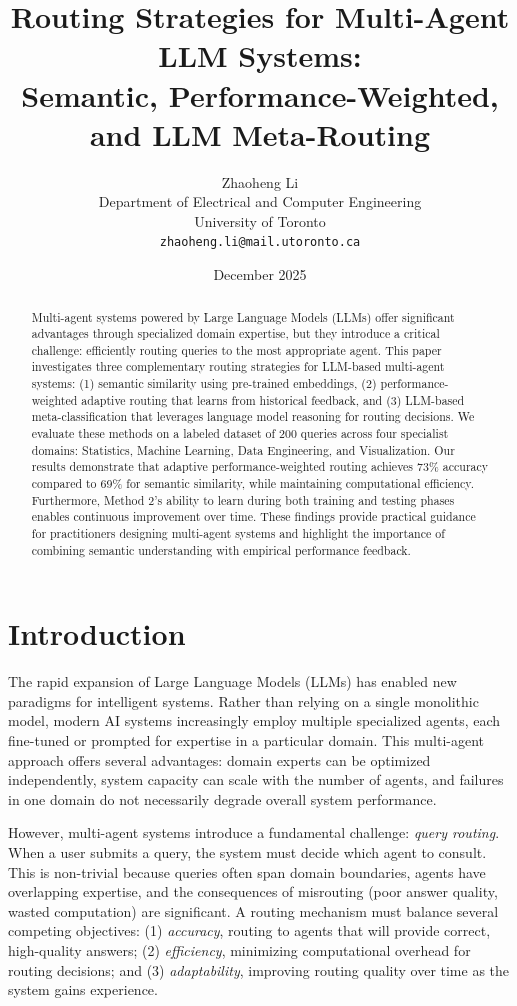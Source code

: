 \documentclass[11pt]{article}
\title{Routing Strategies for Multi-Agent LLM Systems:\\
Semantic, Performance-Weighted, and LLM Meta-Routing}
\author{
  Zhaoheng Li \\
  Department of Electrical and Computer Engineering \\
  University of Toronto \\
  \texttt{zhaoheng.li@mail.utoronto.ca}
}
\date{December 2025}
\begin{document}
\maketitle

\begin{abstract}
Multi-agent systems powered by Large Language Models (LLMs) offer significant advantages through specialized domain expertise, but they introduce a critical challenge: efficiently routing queries to the most appropriate agent. This paper investigates three complementary routing strategies for LLM-based multi-agent systems: (1) semantic similarity using pre-trained embeddings, (2) performance-weighted adaptive routing that learns from historical feedback, and (3) LLM-based meta-classification that leverages language model reasoning for routing decisions. We evaluate these methods on a labeled dataset of 200 queries across four specialist domains: Statistics, Machine Learning, Data Engineering, and Visualization. Our results demonstrate that adaptive performance-weighted routing achieves 73\% accuracy compared to 69\% for semantic similarity, while maintaining computational efficiency. Furthermore, Method 2's ability to learn during both training and testing phases enables continuous improvement over time. These findings provide practical guidance for practitioners designing multi-agent systems and highlight the importance of combining semantic understanding with empirical performance feedback.
\end{abstract}

\section{Introduction}

The rapid expansion of Large Language Models (LLMs) has enabled new paradigms for intelligent systems. Rather than relying on a single monolithic model, modern AI systems increasingly employ multiple specialized agents, each fine-tuned or prompted for expertise in a particular domain. This multi-agent approach offers several advantages: domain experts can be optimized independently, system capacity can scale with the number of agents, and failures in one domain do not necessarily degrade overall system performance.

However, multi-agent systems introduce a fundamental challenge: \emph{query routing}. When a user submits a query, the system must decide which agent to consult. This is non-trivial because queries often span domain boundaries, agents have overlapping expertise, and the consequences of misrouting (poor answer quality, wasted computation) are significant. A routing mechanism must balance several competing objectives: (1) \emph{accuracy}, routing to agents that will provide correct, high-quality answers; (2) \emph{efficiency}, minimizing computational overhead for routing decisions; and (3) \emph{adaptability}, improving routing quality over time as the system gains experience.
\end{document}
